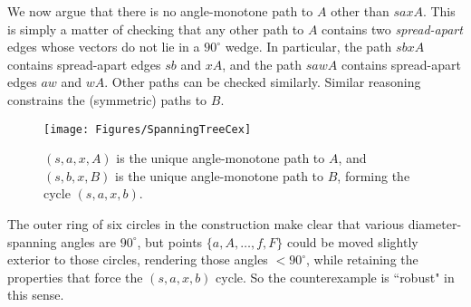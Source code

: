 \documentclass{cccg17}
\newcommand{\bluenew}[1]{{#1}}  %
\newcommand{\cyannew}[1]{{#1}}  %
\newcommand{\rednote}[1]{{}}  %
\newcommand{\figlab}[1]{\label{fig:#1}}
\def\e{{\varepsilon}}
\def\b{{\beta}}
\begin{document}
\cyannew{We now argue that there is no angle-monotone path to $A$ other than $saxA$.
This is simply a matter of checking that any other path to $A$ contains two \emph{spread-apart} edges whose vectors do not lie in a  $90^\circ$ wedge.  In particular, the path $sbxA$ contains spread-apart edges $sb$ and $xA$, and 
the path $sawA$ contains spread-apart edges $aw$ and $wA$.  Other paths can be checked similarly.}
\rednote{AL: Maybe the above argument is clearer.  If you agree, we can delete the next paragraph.}
Similar reasoning constrains the \bluenew{(symmetric)} paths to $B$.
\begin{figure}[htbp]
\centering
\texttt{[image: Figures/SpanningTreeCex]}
\caption{$(s,a,x,A)$ is the unique \cyannew{angle-monotone} %
path to $A$,
and $(s,b,x,B)$ is the unique \bluenew{angle-monotone} path to $B$, \bluenew{forming the cycle $(s,a,x,b)$}.}
\figlab{SpanningTreeCex}
\end{figure}
\rednote{Rev1:
``Given the contents of Section 2, it would be much nicer to have a counter-example to the existence of a spanning tree in a Gabriel triangulation (the one you present looks like a Gabriel triangulation, but there are some disturbing angles equal to $90^\circ$ and the outer boundary is not convex)."
JOR: I added edges to make it convex, and I am pretty certain they do not break
the example, but I left in the $90^\circ$ angles.
I believe that the reviewer is asking is: How robust is our cex? Does it require $=90^\circ$ angles?
Good question. I think it *is* robust, but this needs thought... Here is my conclusion:}

\bluenew{The outer ring of six circles in the construction make clear that various
diameter-spanning angles are $90^\circ$, but points
$\{a,A, \ldots, f,F\}$ could be moved slightly exterior to those circles, rendering those angles
$< 90^\circ$, while retaining the properties that force the $(s,a,x,b)$ cycle.
So the counterexample is ``robust" in this sense.}
\rednote{AL: Thank you, this seems good.}
\end{document}
